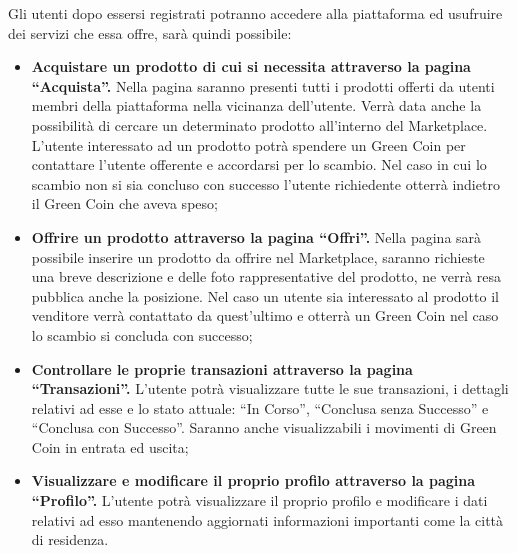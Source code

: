 Gli utenti dopo essersi registrati potranno accedere alla piattaforma ed usufruire dei servizi che essa offre, sarà quindi possibile:  
\begin{itemize}
    \item \textbf{Acquistare un prodotto di cui si necessita attraverso la pagina “Acquista”.} Nella pagina saranno presenti tutti i prodotti offerti da utenti membri della piattaforma nella vicinanza dell'utente. Verrà data anche la possibilità di cercare un determinato prodotto all'interno del Marketplace. L'utente interessato ad un prodotto potrà spendere un Green Coin per contattare l'utente offerente e accordarsi per lo scambio. Nel caso in cui lo scambio non si sia concluso con successo l'utente richiedente otterrà indietro il Green Coin che aveva speso;
    \item \textbf{Offrire un prodotto attraverso la pagina “Offri”.} Nella pagina sarà possibile inserire un prodotto da offrire nel Marketplace, saranno richieste una breve descrizione e delle foto rappresentative del prodotto, ne verrà resa pubblica anche la posizione. Nel caso un utente sia interessato al prodotto il venditore verrà contattato da quest'ultimo e otterrà un Green Coin nel caso lo scambio si concluda con successo;
    \item \textbf{Controllare le proprie transazioni attraverso la pagina “Transazioni”.} L'utente potrà visualizzare tutte le sue transazioni, i dettagli relativi ad esse e lo stato attuale: “In Corso”, “Conclusa senza Successo” e “Conclusa con Successo”. Saranno anche visualizzabili i movimenti di Green Coin in entrata ed uscita;
    \item \textbf{Visualizzare e modificare il proprio profilo attraverso la pagina “Profilo”.} L'utente potrà visualizzare il proprio profilo e modificare i dati relativi ad esso mantenendo aggiornati informazioni importanti come la città di residenza.
\end{itemize}